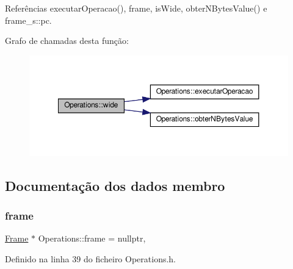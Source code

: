 Referências executar\+Operacao(), frame, is\+Wide, obter\+N\+Bytes\+Value() e frame\+\_\+s\+::pc.

Grafo de chamadas desta função\+:\nopagebreak
\begin{figure}[H]
\begin{center}
\leavevmode
\includegraphics[width=350pt]{classOperations_ab1474dfc4eb5142361b00d185f0a4a2b_cgraph}
\end{center}
\end{figure}


\subsection{Documentação dos dados membro}
\mbox{\label{classOperations_a0dc7b3710786c9cbd14801ac3e5d34b2}} 
\subsubsection{\texorpdfstring{frame}{frame}}
{\footnotesize\ttfamily \hyperlink{PilhaJVM_8h_acc380914b41a084dcc8e4b38fb200145}{Frame} $\ast$ Operations\+::frame = nullptr\hspace{0.3cm}{\ttfamily [static]}, {\ttfamily [private]}}



Definido na linha 39 do ficheiro Operations.\+h.



